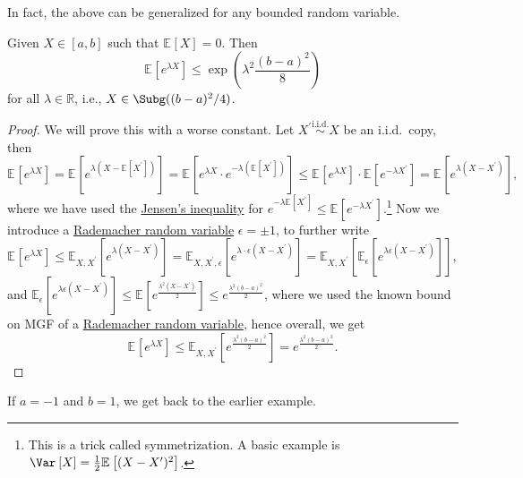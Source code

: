 In fact, the above can be generalized for any bounded random variable.

\begin{lemma}\label{lma:bounded-rv-is-sub-gaussian}
  Given \(X\in [a, b]\) such that \(\mathbb{E}_{}\left[X \right] = 0\). Then
  \[
    \mathbb{E}_{}\left[e^{\lambda X} \right] \leq \exp (\lambda ^2 \frac{(b-a)^2}{8})
  \]
  for all \(\lambda \in \mathbb{R} \), i.e., \(X\in \Subg((b-a)^2 / 4) \).
\end{lemma}
\begin{proof}
  We will prove this with a worse constant. Let \(X^{\prime} \overset{\text{i.i.d.} }{\sim } X\) be an i.i.d.\ copy, then
  \[
    \mathbb{E}_{}\left[e^{\lambda X} \right]
    = \mathbb{E}_{}\left[e^{\lambda (X - \mathbb{E}_{}\left[X^{\prime}  \right] )} \right]
    = \mathbb{E}_{}\left[e^{\lambda X}\cdot e^{-\lambda (\mathbb{E}_{}\left[X^{\prime}  \right] )} \right]
    \leq \mathbb{E}_{}\left[e^{\lambda X} \right] \cdot \mathbb{E}_{}\left[e^{-\lambda X^{\prime} } \right]
    = \mathbb{E}_{}\left[e^{\lambda (X - X^{\prime} )} \right],
  \]
  where we have used the \href{https://en.wikipedia.org/wiki/Jensen%27s_inequality}{Jensen's inequality} for \(e^{-\lambda \mathbb{E}_{}\left[X^{\prime}  \right] } \leq \mathbb{E}_{}\left[e^{-\lambda X^{\prime} } \right] \).\footnote{This is a trick called symmetrization. A basic example is \(\Var_{}\left[X \right] = \frac{1}{2} \mathbb{E}_{}\left[(X - X^{\prime} )^2 \right] \).} Now we introduce a \hyperref[eg:Rademacher-random-varaible]{Rademacher random variable} \(\epsilon = \pm 1\), to further write
  \[
    \mathbb{E}_{}\left[e^{\lambda X} \right]
    \leq \mathbb{E}_{X, X^{\prime} }\left[e^{\lambda (X - X^{\prime} )} \right]
    = \mathbb{E}_{X, X^{\prime} , \epsilon }\left[ e^{\lambda \cdot \epsilon (X - X^{\prime} )} \right]
    = \mathbb{E}_{X, X^{\prime} }\left[ \mathbb{E}_{\epsilon }\left[e^{\lambda \epsilon (X - X^{\prime} )} \right]  \right] ,
  \]
  and \(\mathbb{E}_{\epsilon }\left[ e^{\lambda \epsilon (X - X^{\prime} )} \right] \leq \mathbb{E}_{}\left[e^{\frac{\lambda ^2(X - X^{\prime} )}{2}} \right] \leq e^{\frac{\lambda ^2(b - a)^2}{2}} \), where we used the known bound on MGF of a \hyperref[eg:Rademacher-random-varaible]{Rademacher random variable}, hence overall, we get
  \[
    \mathbb{E}_{}\left[e^{\lambda X} \right] \leq \mathbb{E}_{X, X^{\prime} }\left[e^{\frac{\lambda ^2(b-a)^2}{2}} \right] = e^{\frac{\lambda ^2(b-a)^2}{2}}.
  \]
\end{proof}

\begin{note}
  If \(a = -1\) and \(b = 1\), we get back to the earlier example.
\end{note}

